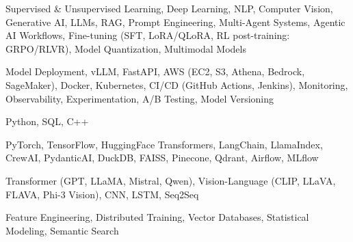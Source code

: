 \documentclass[letter,10pt]{article}
\begin{document}
 Supervised \& Unsupervised Learning, Deep Learning, NLP, Computer Vision, Generative AI, LLMs, RAG, Prompt Engineering, Multi-Agent Systems, Agentic AI Workflows, Fine-tuning (SFT, LoRA/QLoRA, RL post-training: GRPO/RLVR), Model Quantization, Multimodal Models\par\vspace{2pt}

 Model Deployment, vLLM, FastAPI, AWS (EC2, S3, Athena, Bedrock, SageMaker), Docker, Kubernetes, CI/CD (GitHub Actions, Jenkins), Monitoring, Observability, Experimentation, A/B Testing, Model Versioning\par\vspace{2pt}

 Python, SQL, C++\par\vspace{2pt}

 PyTorch, TensorFlow, HuggingFace Transformers, LangChain, LlamaIndex, CrewAI, PydanticAI, DuckDB, FAISS, Pinecone, Qdrant, Airflow, MLflow\par\vspace{2pt}

 Transformer (GPT, LLaMA, Mistral, Qwen), Vision-Language (CLIP, LLaVA, FLAVA, Phi-3 Vision), CNN, LSTM, Seq2Seq\par\vspace{2pt}

 Feature Engineering, Distributed Training, Vector Databases, Statistical Modeling, Semantic Search
\end{document}
